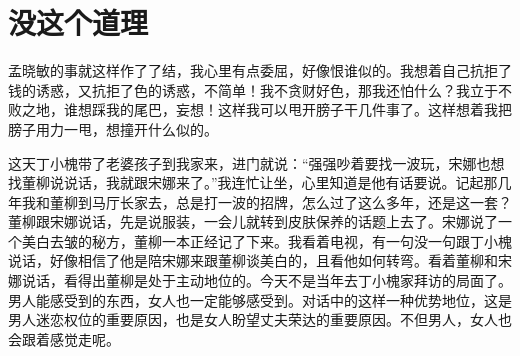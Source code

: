 \documentclass[12pt,oneside]{book}
\begin{document}
\chapter{没这个道理}

孟晓敏的事就这样作了了结，我心里有点委屈，好像恨谁似的。我想着自己抗拒了钱的诱惑，又抗拒了色的诱惑，不简单！我不贪财好色，那我还怕什么？我立于不败之地，谁想踩我的尾巴，妄想！这样我可以甩开膀子干几件事了。这样想着我把膀子用力一甩，想撞开什么似的。

这天丁小槐带了老婆孩子到我家来，进门就说：``强强吵着要找一波玩，宋娜也想找董柳说说话，我就跟宋娜来了。''我连忙让坐，心里知道是他有话要说。记起那几年我和董柳到马厅长家去，总是打一波的招牌，怎么过了这么多年，还是这一套？董柳跟宋娜说话，先是说服装，一会儿就转到皮肤保养的话题上去了。宋娜说了一个美白去皱的秘方，董柳一本正经记了下来。我看着电视，有一句没一句跟丁小槐说话，好像相信了他是陪宋娜来跟董柳谈美白的，且看他如何转弯。看着董柳和宋娜说话，看得出董柳是处于主动地位的。今天不是当年去丁小槐家拜访的局面了。男人能感受到的东西，女人也一定能够感受到。对话中的这样一种优势地位，这是男人迷恋权位的重要原因，也是女人盼望丈夫荣达的重要原因。不但男人，女人也会跟着感觉走呢。
\end{document}
